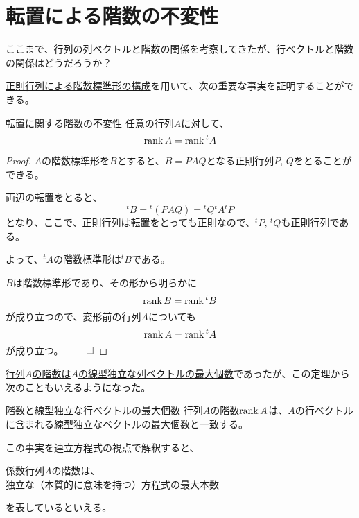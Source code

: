 \documentclass[../../../topic_linear-algebra]{subfiles}
\begin{document}
\sectionline
\section{転置による階数の不変性}

ここまで、行列の列ベクトルと階数の関係を考察してきたが、行ベクトルと階数の関係はどうだろうか？

\br

\hyperref[thm:rank-normal-form-by-regular-matrices]{正則行列による階数標準形の構成}を用いて、次の重要な事実を証明することができる。

\begin{theorem}{転置に関する階数の不変性}
  任意の行列$A$に対して、
  \begin{equation*}
    \rank A = \rank {}^t A
  \end{equation*}
\end{theorem}

\begin{proof}
  $A$の階数標準形を$B$とすると、$B=PAQ$となる正則行列$P,\,Q$をとることができる。

  両辺の転置をとると、
  \begin{equation*}
    {}^t B = {}^t (PAQ) = {}^t Q {}^t A {}^t P
  \end{equation*}
  となり、ここで、\hyperref[thm:transpose-of-invertible]{正則行列は転置をとっても正則}なので、${}^t P,\,{}^t Q$も正則行列である。

  よって、${}^tA$の階数標準形は${}^t B$である。

  \br

  $B$は階数標準形であり、その形から明らかに
  \begin{equation*}
    \rank B = \rank {}^t B
  \end{equation*}
  が成り立つので、変形前の行列$A$についても
  \begin{equation*}
    \rank A = \rank {}^t A
  \end{equation*}
  が成り立つ。 $\qed$
\end{proof}

\br

\hyperref[thm:rank-equals-max-indep-cols]{行列$A$の階数は$A$の線型独立な列ベクトルの最大個数}であったが、この定理から次のこともいえるようになった。

\begin{theorem}{階数と線型独立な行ベクトルの最大個数}
  行列$A$の階数$\rank A$は、$A$の行ベクトルに含まれる線型独立なベクトルの最大個数と一致する。
\end{theorem}

\br

この事実を連立方程式の視点で解釈すると、
\begin{emphabox}
  \begin{spacebox}
    \begin{center}
      係数行列$A$の階数は、\\
      独立な（本質的に意味を持つ）方程式の最大本数
    \end{center}
  \end{spacebox}
\end{emphabox}
を表しているといえる。
\end{document}
